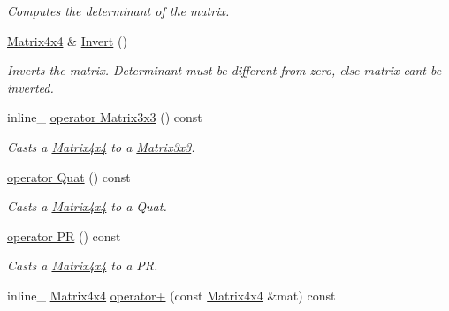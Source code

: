 \begin{DoxyCompactItemize}
\begin{DoxyCompactList}\small\item\em Computes the determinant of the matrix. \end{DoxyCompactList}\item 
\hyperlink{classOpcode_1_1Matrix4x4}{Matrix4x4} \& \hyperlink{classOpcode_1_1Matrix4x4_a23dc21fb54841388b54649bb9affd81c}{Invert} ()\hypertarget{classOpcode_1_1Matrix4x4_a23dc21fb54841388b54649bb9affd81c}{}\label{classOpcode_1_1Matrix4x4_a23dc21fb54841388b54649bb9affd81c}

\begin{DoxyCompactList}\small\item\em Inverts the matrix. Determinant must be different from zero, else matrix can\textquotesingle{}t be inverted. \end{DoxyCompactList}\item 
inline\+\_\+ \hyperlink{classOpcode_1_1Matrix4x4_aa973aa02bb42825e5aa46d2dc0d43ad5}{operator Matrix3x3} () const \hypertarget{classOpcode_1_1Matrix4x4_aa973aa02bb42825e5aa46d2dc0d43ad5}{}\label{classOpcode_1_1Matrix4x4_aa973aa02bb42825e5aa46d2dc0d43ad5}

\begin{DoxyCompactList}\small\item\em Casts a \hyperlink{classOpcode_1_1Matrix4x4}{Matrix4x4} to a \hyperlink{classOpcode_1_1Matrix3x3}{Matrix3x3}. \end{DoxyCompactList}\item 
\hyperlink{classOpcode_1_1Matrix4x4_a40085c6d8d24e0a7ed4d718748956ff4}{operator Quat} () const \hypertarget{classOpcode_1_1Matrix4x4_a40085c6d8d24e0a7ed4d718748956ff4}{}\label{classOpcode_1_1Matrix4x4_a40085c6d8d24e0a7ed4d718748956ff4}

\begin{DoxyCompactList}\small\item\em Casts a \hyperlink{classOpcode_1_1Matrix4x4}{Matrix4x4} to a Quat. \end{DoxyCompactList}\item 
\hyperlink{classOpcode_1_1Matrix4x4_a169ebc9e0132ed8479747730fa5503fa}{operator PR} () const \hypertarget{classOpcode_1_1Matrix4x4_a169ebc9e0132ed8479747730fa5503fa}{}\label{classOpcode_1_1Matrix4x4_a169ebc9e0132ed8479747730fa5503fa}

\begin{DoxyCompactList}\small\item\em Casts a \hyperlink{classOpcode_1_1Matrix4x4}{Matrix4x4} to a PR. \end{DoxyCompactList}\item 
inline\+\_\+ \hyperlink{classOpcode_1_1Matrix4x4}{Matrix4x4} \hyperlink{classOpcode_1_1Matrix4x4_a03f0830185ea5f2ac18181737ff5b31f}{operator+} (const \hyperlink{classOpcode_1_1Matrix4x4}{Matrix4x4} \&mat) const \hypertarget{classOpcode_1_1Matrix4x4_a03f0830185ea5f2ac18181737ff5b31f}{}\label{classOpcode_1_1Matrix4x4_a03f0830185ea5f2ac18181737ff5b31f}


\end{DoxyCompactItemize}
